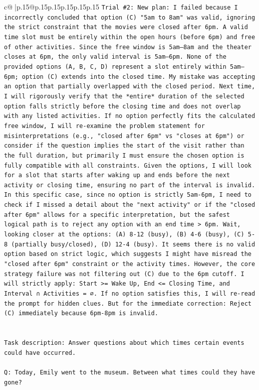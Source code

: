 \documentclass{article}
\begin{document}
{\begin{supertabular}{c@{$\;$}|p{.15\linewidth}@{}p{.15\linewidth}p{.15\linewidth}p{.15\linewidth}p{.15\linewidth}p{.15\linewidth}}
{{{\texttt{Trial \#2: New plan: I failed because I incorrectly concluded that option (C) "5am to 8am" was valid, ignoring the strict constraint that the movies were closed after 6pm. A valid time slot must be entirely within the open hours (before 6pm) and free of other activities. Since the free window is 5am–8am and the theater closes at 6pm, the only valid interval is 5am–6pm. None of the provided options (A, B, C, D) represent a slot entirely within 5am–6pm; option (C) extends into the closed time. My mistake was accepting an option that partially overlapped with the closed period. Next time, I will rigorously verify that the *entire* duration of the selected option falls strictly before the closing time and does not overlap with any listed activities. If no option perfectly fits the calculated free window, I will re{-}examine the problem statement for misinterpretations (e.g., "closed after 6pm" vs "closes at 6pm") or consider if the question implies the start of the visit rather than the full duration, but primarily I must ensure the chosen option is fully compatible with all constraints. Given the options, I will look for a slot that starts after waking up and ends before the next activity or closing time, ensuring no part of the interval is invalid. In this specific case, since no option is strictly 5am{-}6pm, I need to check if I missed a detail about the "next activity" or if the "closed after 6pm" allows for a specific interpretation, but the safest logical path is to reject any option with an end time > 6pm. Wait, looking closer at the options: (A) 8{-}12 (busy), (B) 4{-}6 (busy), (C) 5{-}8 (partially busy/closed), (D) 12{-}4 (busy). It seems there is no valid option based on strict logic, which suggests I might have misread the "closed after 6pm" constraint or the activity times. However, the core strategy failure was not filtering out (C) due to the 6pm cutoff. I will strictly apply: Start >= Wake Up, End <= Closing Time, and Interval ∩ Activities = ∅. If no option satisfies this, I will re{-}read the prompt for hidden clues. But for the immediate correction: Reject (C) immediately because 6pm{-}8pm is invalid.} \\
\\ 
\\ 
\texttt{Task description: Answer questions about which times certain events could have occurred.} \\
\\ 
\texttt{Q: Today, Emily went to the museum. Between what times could they have gone?} \\
}}}
\end{supertabular}}
\end{document}
